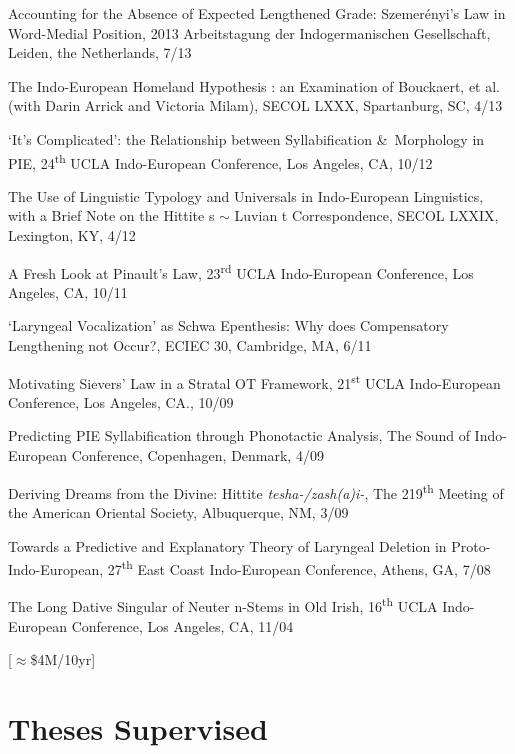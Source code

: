 \documentclass[paper=letter,fontsize=11pt]{scrartcl}
\newcommand{\TalkEntry}[4]{
		\noindent #1, #2, #3 #4}
\begin{document}
\begin{etaremune}
\item\TalkEntry{Accounting for the Absence of Expected Lengthened Grade: Szemerényi's Law in Word-Medial Position}{2013 Arbeitstagung der Indogermanischen Gesellschaft, Leiden, the Netherlands}{7/13}
\item\TalkEntry{The Indo-European Homeland Hypothesis : an Examination of Bouckaert, et al. (with Darin Arrick and Victoria Milam)}{SECOL LXXX, Spartanburg, SC}{4/13}
\item\TalkEntry{`It's Complicated': the Relationship between Syllabification \&~Morphology in PIE}{24\textsuperscript{th} UCLA Indo-European Conference, Los Angeles, CA}{10/12}
\item\TalkEntry{The Use of Linguistic Typology and Universals in Indo-European Linguistics, with a Brief Note on the Hittite s $\sim$ Luvian t Correspondence}{SECOL LXXIX, Lexington, KY}{4/12}
\item\TalkEntry{A Fresh Look at Pinault’s Law}{23\textsuperscript{rd} UCLA Indo-European Conference, Los Angeles, CA}{10/11}
\item\TalkEntry{`Laryngeal Vocalization’ as Schwa Epenthesis: Why does Compensatory Lengthening not Occur?}{ECIEC 30, Cambridge, MA}{6/11} 
\item\TalkEntry{Motivating Sievers’ Law in a Stratal OT Framework}{21\textsuperscript{st} UCLA Indo-European Conference, Los Angeles, CA.}{10/09}
\item\TalkEntry{Predicting PIE Syllabification through Phonotactic Analysis}{The Sound of Indo-European Conference, Copenhagen, Denmark}{4/09} 
\item\TalkEntry{Deriving Dreams from the Divine: Hittite \textit{tesha-/zash(a)i-}}{The 219\textsuperscript{th} Meeting of the American Oriental Society, Albuquerque, NM}{3/09} 
\item\TalkEntry{Towards a Predictive and Explanatory Theory of Laryngeal Deletion in Proto-Indo-European}{27\textsuperscript{th} East Coast Indo-European Conference, Athens, GA}{7/08}
\item\TalkEntry{The Long Dative Singular of Neuter n-Stems in Old Irish}{16\textsuperscript{th} UCLA Indo-European Conference, Los Angeles, CA}{11/04}
\end{etaremune}

[$\approx$\$4M/10yr]

\section*{Theses Supervised}
\end{document}
